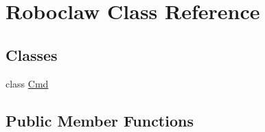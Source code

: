 \hypertarget{classtoxic__hardware_1_1roboclaw__3_1_1Roboclaw}{}\section{Roboclaw Class Reference}
\label{classtoxic__hardware_1_1roboclaw__3_1_1Roboclaw}
\subsection*{Classes}
\begin{DoxyCompactItemize}
\item 
class \mbox{\hyperlink{classtoxic__hardware_1_1roboclaw__3_1_1Roboclaw_1_1Cmd}{Cmd}}
\end{DoxyCompactItemize}
\subsection*{Public Member Functions}
